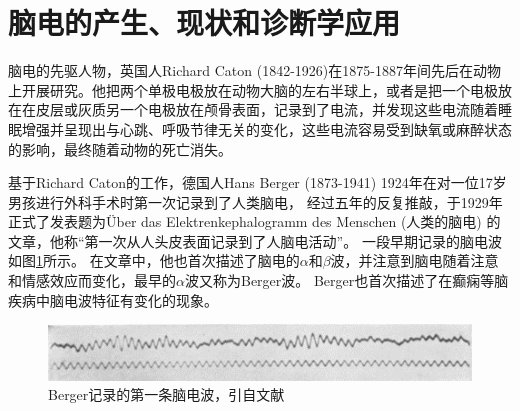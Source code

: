 \thesischapterexordium

\section{脑电的产生、现状和诊断学应用}
脑电的先驱人物，英国人Richard Caton (1842-1926)在1875-1887年间先后在动物上开展研究。他把两个单极电极放在动物大脑的左右半球上，或者是把一个电极放在在皮层或灰质另一个电极放在颅骨表面，记录到了电流，并发现这些电流随着睡眠增强并呈现出与心跳、呼吸节律无关的变化，这些电流容易受到缺氧或麻醉状态的影响，最终随着动物的死亡消失。

基于Richard Caton的工作，德国人Hans Berger (1873-1941) 1924年在对一位17岁男孩进行外科手术时第一次记录到了人类脑电，
经过五年的反复推敲，于1929年正式了发表题为Über das Elektrenkephalogramm des Menschen (人类的脑电) 的文章，他称“第一次从人头皮表面记录到了人脑电活动”。 一段早期记录的脑电波如图\ref{fig1}所示。 在文章中，他也首次描述了脑电的$\alpha$和$\beta$波，并注意到脑电随着注意和情感效应而变化，最早的$\alpha$波又称为Berger波。
Berger也首次描述了在癫痫等脑疾病中脑电波特征有变化的现象。
\begin{figure}
	\includegraphics[width=15cm]{pic/xulun/EEGwave.png}
	\caption{Berger记录的第一条脑电波，引自文献}
	\label{fig1}
\end{figure}

